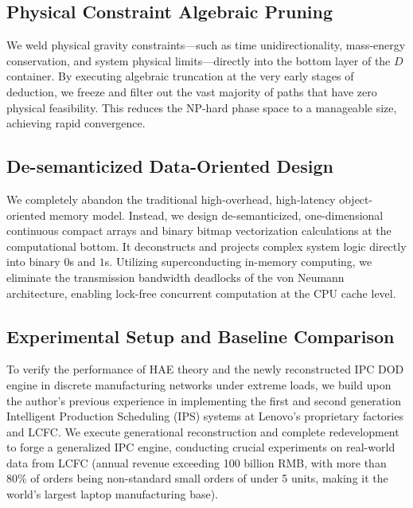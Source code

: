 \documentclass{article}
\begin{document}
\subsection{Physical Constraint Algebraic Pruning}
We weld physical gravity constraints---such as time unidirectionality, mass-energy conservation, and system physical limits---directly into the bottom layer of the $D$ container. By executing algebraic truncation at the very early stages of deduction, we freeze and filter out the vast majority of paths that have zero physical feasibility. This reduces the NP-hard phase space to a manageable size, achieving rapid convergence.

\subsection{De-semanticized Data-Oriented Design}
We completely abandon the traditional high-overhead, high-latency object-oriented memory model. Instead, we design de-semanticized, one-dimensional continuous compact arrays and binary bitmap vectorization calculations at the computational bottom. It deconstructs and projects complex system logic directly into binary $0$s and $1$s. Utilizing superconducting in-memory computing, we eliminate the transmission bandwidth deadlocks of the von Neumann architecture, enabling lock-free concurrent computation at the CPU cache level.

\subsection{Experimental Setup and Baseline Comparison}
To verify the performance of HAE theory and the newly reconstructed IPC DOD engine in discrete manufacturing networks under extreme loads, we build upon the author's previous experience in implementing the first and second generation Intelligent Production Scheduling (IPS) systems at Lenovo's proprietary factories and LCFC. We execute generational reconstruction and complete redevelopment to forge a generalized IPC engine, conducting crucial experiments on real-world data from LCFC (annual revenue exceeding 100 billion RMB, with more than 80\% of orders being non-standard small orders of under 5 units, making it the world's largest laptop manufacturing base).
\end{document}
